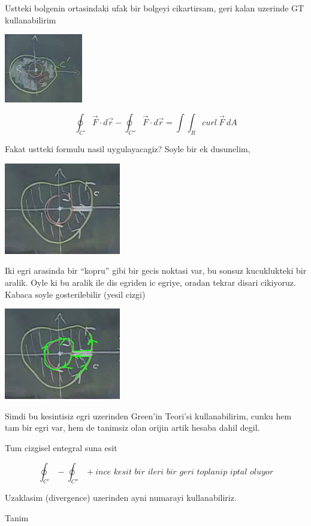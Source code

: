 \documentclass[12pt,fleqn]{article}\usepackage{../common}
\begin{document}
Ustteki bolgenin ortasindaki ufak bir bolgeyi cikartirsam, geri kalan
uzerinde GT kullanabilirim

\includegraphics[height=3cm]{24_4.png}


\[ \oint_{C'} \vec{F} \cdot d\vec{r} - 
\oint_{C''} \vec{F} \cdot d\vec{r}  =
\int \int_R curl \ \vec{F} \ dA 
\]
 
Fakat ustteki formulu nasil uygulayacagiz? Soyle bir ek dusunelim, 

\includegraphics[height=4cm]{24_5.png}

Iki egri arasinda bir ``kopru'' gibi bir gecis noktasi var, bu sonsuz
kucuklukteki bir aralik. Oyle ki bu aralik ile dis egriden ic egriye,
oradan tekrar disari cikiyoruz. Kabaca soyle gosterilebilir (yesil cizgi)

\includegraphics[height=4cm]{24_6.png}

Simdi bu kesintisiz egri uzerinden Green'in Teori'si kullanabilirim, cunku
hem tam bir egri var, hem de tanimsiz olan orijin artik hesaba dahil
degil. 

Tum cizgisel entegral suna esit 

\[ \oint_{C'} - \oint_{C''} + \textit{ince kesit bir ileri bir geri
  toplanip iptal oluyor} \] 

Uzaklasim (divergence) uzerinden ayni numarayi kullanabiliriz. 

Tanim 
\end{document}
